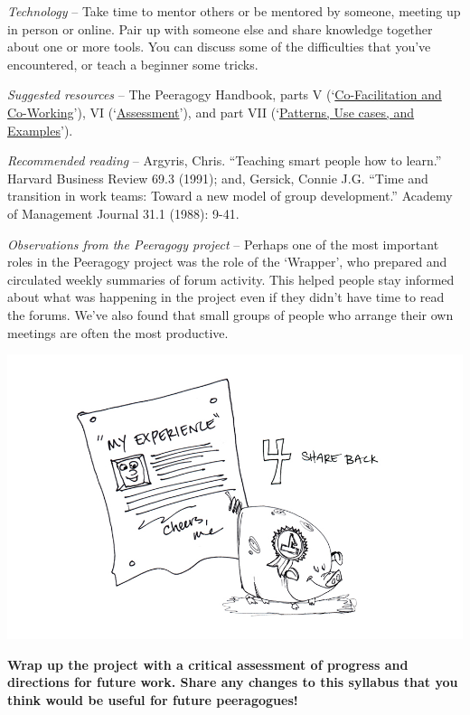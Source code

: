 \emph{Technology} -- Take time to mentor others or be mentored by
someone, meeting up in person or online. Pair up with someone else and
share knowledge together about one or more tools. You can discuss some
of the difficulties that you've encountered, or teach a beginner some
tricks.

\emph{Suggested resources} -- The Peeragogy Handbook, parts V
(`\href{http://peeragogy.org/co-facilitation/}{Co-Facilitation and
Co-Working}'), VI
(`\href{http://peeragogy.org/assessment/}{Assessment}'), and part VII
(`\href{http://peeragogy.org/patterns-usecases/}{Patterns, Use cases,
and Examples}').

\emph{Recommended reading} -- Argyris, Chris. ``Teaching smart people
how to learn.'' Harvard Business Review 69.3 (1991); and, Gersick,
Connie J.G. ``Time and transition in work teams: Toward a new model of
group development.'' Academy of Management Journal 31.1 (1988): 9-41.

\emph{Observations from the Peeragogy project} -- Perhaps one of the
most important roles in the Peeragogy project was the role of the
`Wrapper', who prepared and circulated weekly summaries of forum
activity. This helped people stay informed about what was happening in
the project even if they didn't have time to read the forums. We've also
found that small groups of people who arrange their own meetings are
often the most productive.

\begin{center}
\includegraphics{../pictures/OpenBook-2-4.jpg}
\end{center}

\textbf{Wrap up the project with a critical assessment of progress and
directions for future work. Share any changes to this syllabus that you
think would be useful for future peeragogues!}

